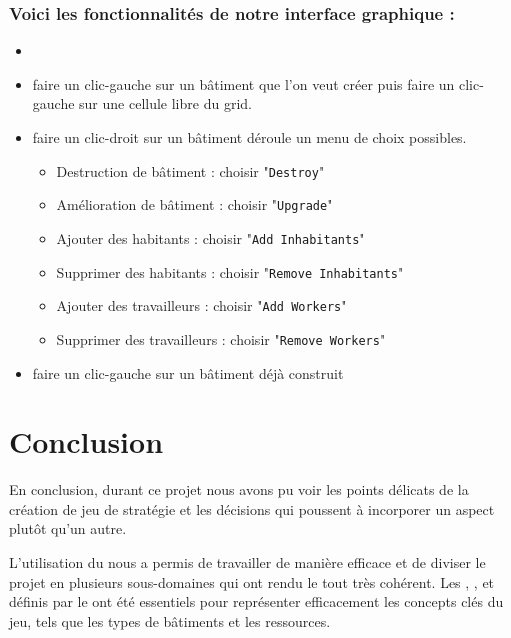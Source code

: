 \documentclass[a4paper,11pt]{article}
\begin{document}
\subsubsection{Voici les fonctionnalités de notre interface graphique : }
\begin{itemize}
	\item {}
	\item {} faire un clic-gauche sur un bâtiment que l'on veut créer puis faire un clic-gauche sur une cellule libre du grid.
	\item {} faire un clic-droit sur un bâtiment déroule un menu de choix possibles.
	      \begin{itemize}
		      \item Destruction de bâtiment : choisir "\texttt{Destroy}"
		      \item Amélioration de bâtiment : choisir "\texttt{Upgrade}" %
		      \item Ajouter des habitants : choisir "\texttt{Add Inhabitants}"
		      \item Supprimer des habitants : choisir "\texttt{Remove Inhabitants}"
		      \item Ajouter des travailleurs : choisir "\texttt{Add Workers}"
		      \item Supprimer des travailleurs : choisir "\texttt{Remove Workers}"
	      \end{itemize}
	\item {} faire un clic-gauche sur un bâtiment déjà construit
\end{itemize}


\clearpage

\section{Conclusion}
En conclusion, durant ce projet nous avons pu voir les points délicats de la création de jeu de stratégie et les décisions qui poussent à incorporer un aspect plutôt qu'un autre.

L'utilisation du  nous a permis de travailler de manière efficace et de diviser le projet en plusieurs sous-domaines qui ont rendu le tout très cohérent.
Les , , et  définis par le  ont été essentiels pour représenter efficacement les concepts clés du jeu, tels que les types de bâtiments et les ressources.
\end{document}
